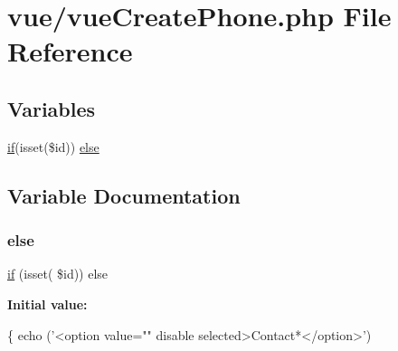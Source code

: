 \hypertarget{vue_create_phone_8php}{}\section{vue/vue\+Create\+Phone.php File Reference}
\label{vue_create_phone_8php}
\subsection*{Variables}
\begin{DoxyCompactItemize}
\item 
\hyperlink{controleur_create_phone_8php_ae87c4f53487f23ee9a965a6691be21d2}{if}(isset(\$id)) \hyperlink{vue_create_phone_8php_a85ee6d6c47ed559743671162bcfb8385}{else}
\end{DoxyCompactItemize}


\subsection{Variable Documentation}
\mbox{\label{vue_create_phone_8php_a85ee6d6c47ed559743671162bcfb8385}} 
\subsubsection{\texorpdfstring{else}{else}}
{\footnotesize\ttfamily \hyperlink{controleur_create_phone_8php_ae87c4f53487f23ee9a965a6691be21d2}{if} (isset( \$id)) else}

{\bfseries Initial value\+:}
\begin{DoxyCode}
\{
                                            echo (\textcolor{stringliteral}{'<option value="" disable selected>Contact*</option>'})
\end{DoxyCode}

